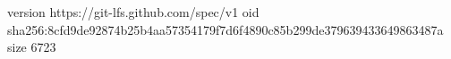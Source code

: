 version https://git-lfs.github.com/spec/v1
oid sha256:8cfd9de92874b25b4aa57354179f7d6f4890c85b299de379639433649863487a
size 6723
